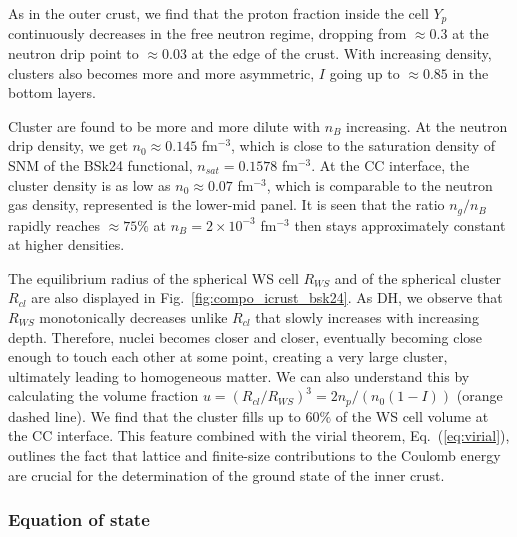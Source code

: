 As in the outer crust, we find that the proton fraction inside the cell $Y_p$ 
continuously decreases in the free neutron regime, dropping from $\approx 0.3$ 
at the neutron drip point to $\approx 0.03$ at the edge of the crust. With
increasing density, clusters also becomes more and more asymmetric, $I$ going
up to $\approx 0.85$ in the bottom layers.

Cluster are found to be more and more dilute with $n_B$ increasing. At the
neutron drip density, we get $n_0 \approx 0.145$ fm$^{-3}$, which is close to the
saturation density of SNM of the BSk24 functional, $n_{sat} = 0.1578$ 
fm$^{-3}$. At the CC interface, the cluster density is as low as $n_0
\approx 0.07$ fm$^{-3}$, which is comparable to the neutron gas density, 
represented is the lower-mid panel. It is seen that the ratio $n_g/n_B$ rapidly
reaches $\approx 75\%$ at $n_B =2\times 10^{-3}$ fm$^{-3}$ then stays
approximately constant at higher densities.

The equilibrium radius of the spherical WS cell $R_{WS}$ and of the spherical 
cluster $R_{cl}$ are also displayed in Fig.~\ref{fig:compo_icrust_bsk24}. As
DH, we observe that $R_{WS}$ monotonically decreases unlike $R_{cl}$ that
slowly increases with increasing depth. Therefore, nuclei becomes closer and closer,
eventually becoming close enough to touch each other at some point, creating a
very large cluster, ultimately leading to homogeneous matter. We can also
understand this by calculating the volume fraction
$u=(R_{cl}/R_{WS})^3 = 2n_p/(n_0(1-I))$ (orange dashed line). We find that the 
cluster fills up to $60\%$ of the WS cell volume at the CC interface. This 
feature combined with the virial theorem, Eq.~(\ref{eq:virial}), outlines the 
fact that lattice and finite-size contributions to the Coulomb energy are 
crucial for the determination of the ground state of the inner crust.

\subsubsection{Equation of state}\label{subsubsec:icrusteos}

